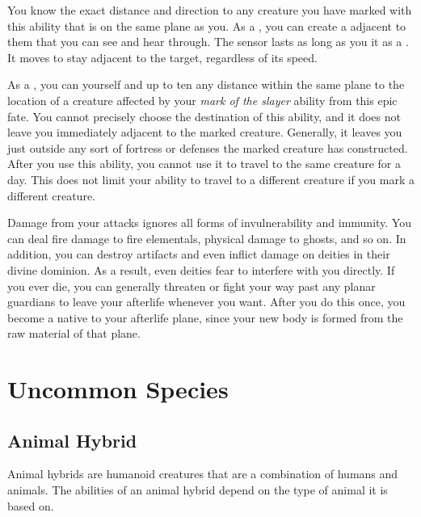             You know the exact distance and direction to any creature you have marked with this ability that is on the same plane as you.
            As a , you can create a  adjacent to them that you can see and hear through.
            The sensor lasts as long as you  it as a .
            It moves to stay adjacent to the target, regardless of its speed.

             As a , you can  yourself and up to ten  any distance within the same plane to the location of a creature affected by your \textit{mark of the slayer} ability from this epic fate.
            You cannot precisely choose the destination of this ability, and it does not leave you immediately adjacent to the marked creature.
            Generally, it leaves you just outside any sort of fortress or defenses the marked creature has constructed.
            After you use this ability, you cannot use it to travel to the same creature for a day.
            This does not limit your ability to travel to a different creature if you mark a different creature.

            Damage from your attacks ignores all forms of invulnerability and immunity.
            You can deal fire damage to fire elementals, physical damage to ghosts, and so on.
            In addition, you can destroy artifacts and even inflict damage on deities in their divine dominion.
            As a result, even deities fear to interfere with you directly.
            If you ever die, you can generally threaten or fight your way past any planar guardians to leave your afterlife whenever you want.
            After you do this once, you become a  native to your afterlife plane, since your new body is formed from the raw material of that plane.

\section{Uncommon Species}\label{Uncommon Species}

    \subsection{Animal Hybrid}
        Animal hybrids are humanoid creatures that are a combination of humans and animals.
        The abilities of an animal hybrid depend on the type of animal it is based on.

